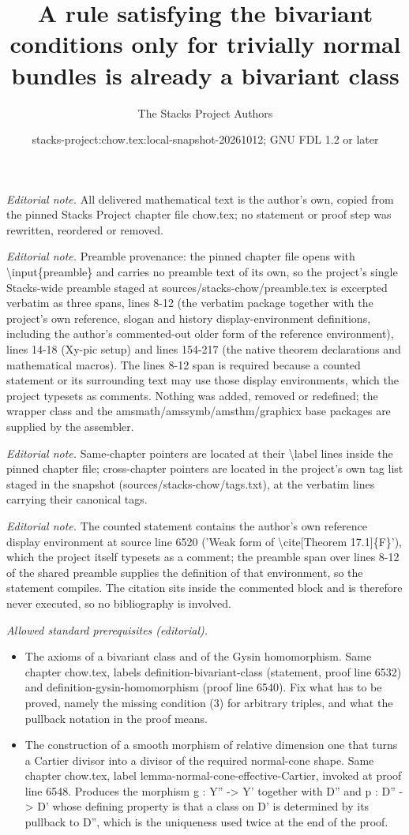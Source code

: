 \documentclass[10pt,a4paper]{amsart}
\title{A rule satisfying the bivariant conditions only for trivially normal bundles is already a bivariant class}
\author{The Stacks Project Authors}
\date{stacks-project:chow.tex:local-snapshot-20261012; GNU FDL 1.2 or later}
\theoremstyle{plain}
\theoremstyle{definition}
\theoremstyle{remark}
\numberwithin{equation}{subsection}
\begin{document}
\maketitle
\noindent\textit{Editorial note.} All delivered mathematical text is the author's own, copied from the pinned Stacks Project chapter file chow.tex; no statement or proof step was rewritten, reordered or removed.\par\medskip
\noindent\textit{Editorial note.} Preamble provenance: the pinned chapter file opens with \textbackslash{}input\{preamble\} and carries no preamble text of its own, so the project's single Stacks-wide preamble staged at sources/stacks-chow/preamble.tex is excerpted verbatim as three spans, lines 8-12 (the verbatim package together with the project's own reference, slogan and history display-environment definitions, including the author's commented-out older form of the reference environment), lines 14-18 (Xy-pic setup) and lines 154-217 (the native theorem declarations and mathematical macros). The lines 8-12 span is required because a counted statement or its surrounding text may use those display environments, which the project typesets as comments. Nothing was added, removed or redefined; the wrapper class and the amsmath/amssymb/amsthm/graphicx base packages are supplied by the assembler.\par\medskip
\noindent\textit{Editorial note.} Same-chapter pointers are located at their \textbackslash{}label lines inside the pinned chapter file; cross-chapter pointers are located in the project's own tag list staged in the snapshot (sources/stacks-chow/tags.txt), at the verbatim lines carrying their canonical tags.\par\medskip
\noindent\textit{Editorial note.} The counted statement contains the author's own reference display environment at source line 6520 ('Weak form of \textbackslash{}cite[Theorem 17.1]\{F\}'), which the project itself typesets as a comment; the preamble span over lines 8-12 of the shared preamble supplies the definition of that environment, so the statement compiles. The citation sits inside the commented block and is therefore never executed, so no bibliography is involved.\par\medskip
\noindent\textit{Allowed standard prerequisites (editorial).}\begin{itemize}
\item The axioms of a bivariant class and of the Gysin homomorphism. Same chapter chow.tex, labels definition-bivariant-class (statement, proof line 6532) and definition-gysin-homomorphism (proof line 6540). Fix what has to be proved, namely the missing condition (3) for arbitrary triples, and what the pullback notation in the proof means.
\item The construction of a smooth morphism of relative dimension one that turns a Cartier divisor into a divisor of the required normal-cone shape. Same chapter chow.tex, label lemma-normal-cone-effective-Cartier, invoked at proof line 6548. Produces the morphism g : Y'' -> Y' together with D'' and p : D'' -> D' whose defining property is that a class on D' is determined by its pullback to D'', which is the uniqueness used twice at the end of the proof.
\end{itemize}\medskip
\end{document}
